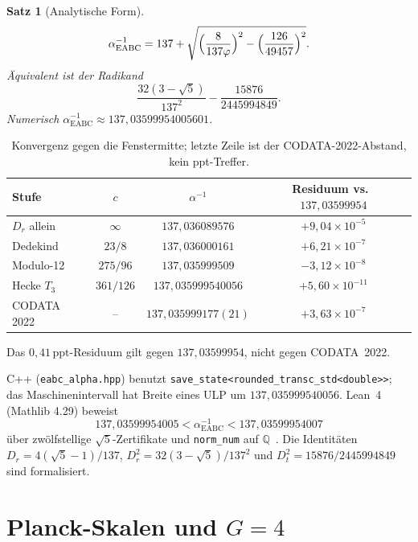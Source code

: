 \documentclass[11pt,a4paper]{article}
\newtheorem{theorem}{Satz}[section]
\theoremstyle{definition}
\theoremstyle{remark}
\numberwithin{equation}{section}
\begin{document}
\begin{theorem}[Analytische Form]
\label{thm:alpha}
\[
\alpha^{-1}_{\mathrm{EABC}}
=137+\sqrt{\Bigl(\frac{8}{137\varphi}\Bigr)^2-\Bigl(\frac{126}{49457}\Bigr)^2}.
\]
Äquivalent ist der Radikand
\[
\frac{32(3-\sqrt{5})}{137^2}-\frac{15876}{2445994849}.
\]
Numerisch $\alpha^{-1}_{\mathrm{EABC}}\approx 137{,}03599954005601$.
\end{theorem}

\begin{table}[ht]
\centering
\small
\begin{tabular}{@{}lccc@{}}
\toprule
Stufe & $c$ & $\alpha^{-1}$ & Residuum vs.\ $137{,}03599954$ \\
\midrule
$D_r$ allein & $\infty$ & $137{,}036089576$ & $+9{,}04\times 10^{-5}$ \\
Dedekind & $23/8$ & $137{,}036000161$ & $+6{,}21\times 10^{-7}$ \\
Modulo-12 & $275/96$ & $137{,}035999509$ & $-3{,}12\times 10^{-8}$ \\
Hecke $T_3$ & $361/126$ & $137{,}035999540056$ & $+5{,}60\times 10^{-11}$ \\
\midrule
CODATA 2022 & -- & $137{,}035999177(21)$ & $+3{,}63\times 10^{-7}$ \\
\bottomrule
\end{tabular}
\caption{Konvergenz gegen die Fenstermitte; letzte Zeile ist der CODATA-2022-Abstand, kein ppt-Treffer.}
\end{table}

Das $0{,}41\,\mathrm{ppt}$-Residuum gilt gegen $137{,}03599954$, nicht gegen CODATA~2022.

C++ (\texttt{eabc\_alpha.hpp}) benutzt \texttt{save\_state<rounded\_transc\_std<double>>};
das Maschinenintervall hat Breite eines ULP um $137{,}035999540056$.
Lean~4 (Mathlib 4.29) beweist
\begin{equation}
137{,}03599954005<\alpha^{-1}_{\mathrm{EABC}}<137{,}03599954007
\end{equation}
über zwölfstellige $\sqrt{5}$-Zertifikate und \texttt{norm\_num} auf $\mathbb{Q}$~\cite{demoura2021,mathlib}.
Die Identitäten $D_r=4(\sqrt{5}-1)/137$, $D_r^2=32(3-\sqrt{5})/137^2$ und $D_t^2=15876/2445994849$ sind formalisiert.

\section{Planck-Skalen und $G=4$}
\end{document}
